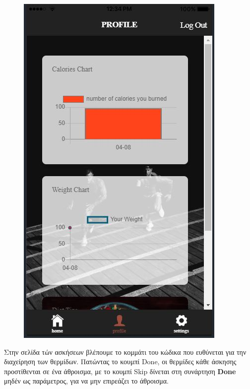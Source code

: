 \documentclass[a4paper,12pt]{article}
\begin{document}
\begin{figure}[!htb]
				  \includegraphics[width=\linewidth]{lesson5}
				\endminipage\hfill
			
			\end{figure}
			\vspace{.5cm}
			Στην σελίδα τών ασκήσεων βλέπουμε το κομμάτι του κώδικα που ευθύνεται για την διαχείρηση των θερμίδων. Πατώντας το κουμπί Done,
			οι θερμίδες κάθε άσκησης προστίθενται σε ένα άθροισμα, με το κουμπί Skip δίνεται στη συνάρτηση \textbf{Done}
			μηδέν ως παράμετρος, για να μην επιρεάζει το άθροισμα.
			\vspace{1cm}
\end{document}
